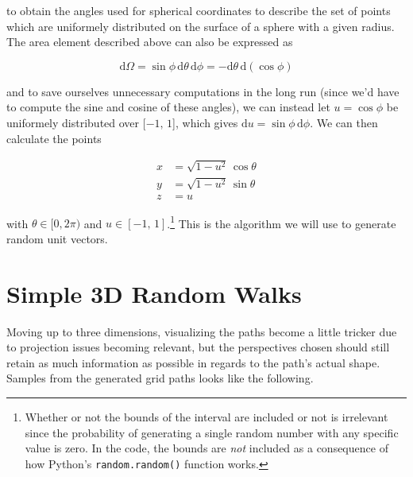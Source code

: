 \documentclass[a4paper,12pt]{article}
\begin{document}
to obtain the angles used for spherical coordinates to describe the set of points which are uniformely distributed
on the surface of a sphere with a given radius. The area element described above can also be expressed as

\begin{equation*}
  \mathrm{d} \Omega = \sin \phi\, \mathrm{d} \theta\, \mathrm{d} \phi = -\mathrm{d} \theta\, \mathrm{d} (\cos \phi)
\end{equation*}

and to save ourselves unnecessary computations in the long run (since we'd have to compute the sine and cosine of
these angles), we can instead let $u = \cos \phi$ be uniformely distributed over $[-1,\, 1$], which gives
$\mathrm{d}u = \sin \phi \, \mathrm{d} \phi$. We can then calculate the points

\begin{equation*}
  \begin{aligned}
    x &= \sqrt{1 - u^2} \, \cos \theta \\
    y &= \sqrt{1 - u^2} \, \sin \theta \\
    z &= u
  \end{aligned}
\end{equation*}

with $\theta \in [0, 2 \pi)$ and $u \in [-1,\, 1]$.\footnote{Whether or not the bounds of the interval are included
or not is irrelevant since the probability of generating a single random number with any specific value is zero.
In the code, the bounds are \emph{not} included as a consequence of how Python's \texttt{random.random()} function
works.} This is the algorithm we will use to generate random unit vectors. \cite{MathWorld}

\section*{Simple 3D Random Walks}

Moving up to three dimensions, visualizing the paths become a little tricker due to projection issues becoming
relevant, but the perspectives chosen should still retain as much information as possible in regards to the path's
actual shape. Samples from the generated grid paths looks like the following.
\end{document}
